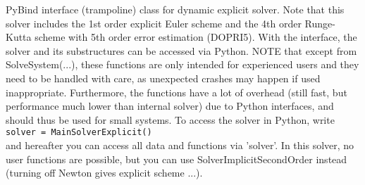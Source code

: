\label{sec:MainSolverExplicit}
PyBind interface (trampoline) class for dynamic explicit solver. Note that this solver includes the 1st order explicit Euler scheme and the 4th order Runge-Kutta scheme with 5th order error estimation (DOPRI5). With the interface, the solver and its substructures can be accessed via Python. NOTE that except from SolveSystem(...), these functions are only intended for experienced users and they need to be handled with care, as unexpected crashes may happen if used inappropriate. Furthermore, the functions have a lot of overhead (still fast, but performance much lower than internal solver) due to Python interfaces, and should thus be used for small systems. To access the solver in Python, write \\ 
 \texttt{solver = MainSolverExplicit()} \\ 
and hereafter you can access all data and functions via 'solver'.
 In this solver, no user functions are possible, but you can use SolverImplicitSecondOrder instead (turning off Newton gives explicit scheme ...).

